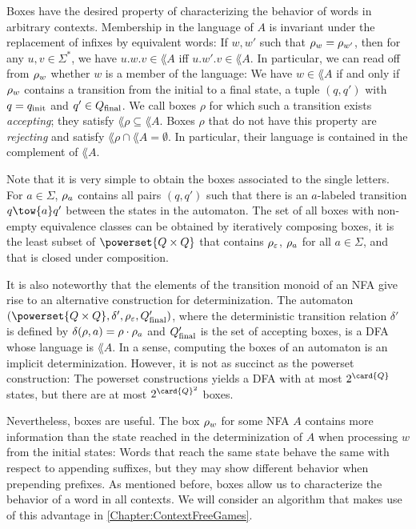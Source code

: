 \documentclass[../../diss.tex]{subfiles}
\begin{document}
Boxes have the desired property of characterizing the behavior of words in arbitrary contexts.
Membership in the language of $A$ is invariant under the replacement of infixes by equivalent words:
If $w,w'$ such that $\tbox{w} = \tbox{w'}$, then for any $u,v \in \Sigma^*$, we have $u.w.v \in \lang{A}$ iff $u.w'.v \in \lang{A}$.
%
In particular, we can read off from $\tbox{w}$ whether $w$ is a member of the language:
We have $w \in \lang{A}$ if and only if $\tbox{w}$ contains a transition from the initial to a final state, \ie a tuple $(q,q')$ with $q = q_{\text{init}}$ and $q' \in Q_{\text{final}}$.
We call boxes $\rho$ for which such a transition exists \emph{accepting}; they satisfy $\lang{\rho} \subseteq \lang{A}$.
Boxes $\rho$ that do not have this property are \emph{rejecting} and satisfy $\lang{\rho} \cap \lang{A} = \emptyset$. In particular, their language is contained in the complement of $\lang{A}$.


Note that it is very simple to obtain the boxes associated to the single letters.
For $a \in \Sigma$, $\tbox{a}$ contains all pairs $(q,q')$ such that there is an $a$-labeled transition $q \tow{a} q'$ between the states in the automaton.
The set of all boxes with non-empty equivalence classes can be obtained by iteratively composing boxes, it is the least subset of $\powerset{Q \times Q}$ that contains $\tbox{\eps}$, $\tbox{a}$ for all $a \in \Sigma$, and that is closed under composition.

It is also noteworthy that the elements of the transition monoid of an NFA give rise to an alternative construction for determinization.
The automaton $(\powerset{Q \times Q}, \delta', \tbox{\eps}, Q_\final')$, where the deterministic transition relation $\delta'$ is defined by $\delta(\rho,a) = \rho \relcomp \tbox{a}$ and $Q_{\text{final}}'$ is the set of accepting boxes, is a DFA whose language is $\lang{A}$.
In a sense, computing the boxes of an automaton is an implicit determinization.
However, it is not as succinct as the powerset construction:
The powerset constructions yields a DFA with at most $2^{\card{Q}}$ states, but there are at most $2^{\card{Q}^2}$ boxes.

Nevertheless, boxes are useful.
The box $\tbox{w}$ for some NFA $A$ contains more information than the state reached in the determinization of $A$ when processing $w$ from the initial states:
Words that reach the same state behave the same with respect to appending suffixes, but they may show different behavior when prepending prefixes.
As mentioned before, boxes allow us to characterize  the behavior of a word in all contexts.
We will consider an algorithm that makes use of this advantage in \cref{Chapter:ContextFreeGames}.
\end{document}

